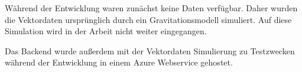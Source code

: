 Während der Entwicklung waren zunächst keine Daten verfügbar.
Daher wurden die Vektordaten ursprünglich durch ein Gravitationsmodell
simuliert. Auf diese Simulation wird in der Arbeit nicht weiter
eingegangen.

Das Backend wurde außerdem mit der Vektordaten Simulierung zu Testzwecken während
der Entwicklung in einem Azure Webservice gehostet.

%	
%		
%	
%				
%		
%		


